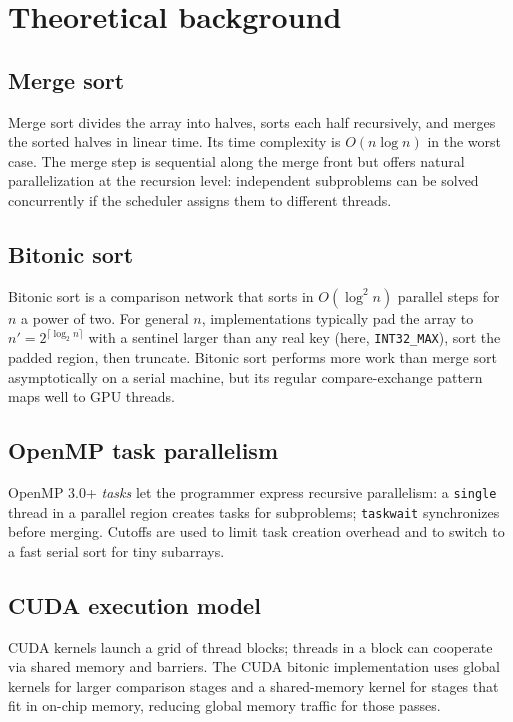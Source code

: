\documentclass[11pt,a4paper]{article}
\begin{document}
\section{Theoretical background}

\subsection{Merge sort}
Merge sort divides the array into halves, sorts each half recursively, and merges the sorted halves in linear time. Its time complexity is $O(n \log n)$ in the worst case. The merge step is sequential along the merge front but offers natural parallelization at the recursion level: independent subproblems can be solved concurrently if the scheduler assigns them to different threads.

\subsection{Bitonic sort}
Bitonic sort is a comparison network that sorts in $O(\log^2 n)$ parallel steps for $n$ a power of two. For general $n$, implementations typically pad the array to $n' = 2^{\lceil \log_2 n \rceil}$ with a sentinel larger than any real key (here, \texttt{INT32\_MAX}), sort the padded region, then truncate. Bitonic sort performs more work than merge sort asymptotically on a serial machine, but its regular compare-exchange pattern maps well to GPU threads.

\subsection{OpenMP task parallelism}
OpenMP 3.0+ \emph{tasks} let the programmer express recursive parallelism: a \texttt{single} thread in a parallel region creates tasks for subproblems; \texttt{taskwait} synchronizes before merging. Cutoffs are used to limit task creation overhead and to switch to a fast serial sort for tiny subarrays.

\subsection{CUDA execution model}
CUDA kernels launch a grid of thread blocks; threads in a block can cooperate via shared memory and barriers. The CUDA bitonic implementation uses global kernels for larger comparison stages and a shared-memory kernel for stages that fit in on-chip memory, reducing global memory traffic for those passes.
\end{document}
